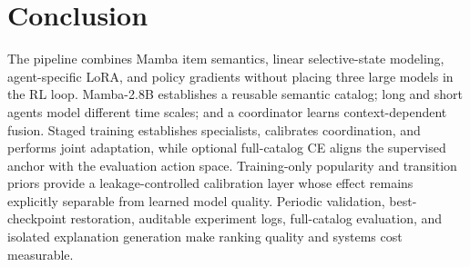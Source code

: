 \documentclass[11pt,a4paper]{article}
\begin{document}
\section{Conclusion}

The pipeline combines Mamba item semantics, linear selective-state modeling,
agent-specific LoRA, and policy gradients without placing three large models in
the RL loop. Mamba-2.8B establishes a reusable semantic catalog; long and short
agents model different time scales; and a coordinator learns context-dependent
fusion. Staged training establishes specialists, calibrates coordination, and
performs joint adaptation, while optional full-catalog CE aligns the supervised
anchor with the evaluation action space. Training-only popularity and transition
priors provide a leakage-controlled calibration layer whose effect remains
explicitly separable from learned model quality. Periodic validation,
best-checkpoint restoration, auditable experiment logs, full-catalog evaluation,
and isolated explanation generation make ranking quality and systems cost
measurable.
\end{document}
